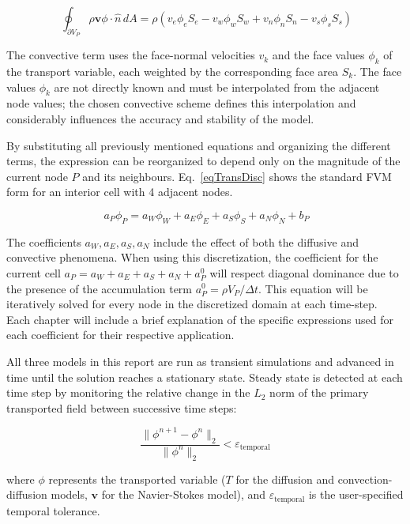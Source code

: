 \begin{equation}~\label{eqTransConv}
    \oint_{\partial V_P} \rho \mathbf{v} \phi \cdot \hat{n} \, dA = \rho (v_e \phi_e S_e - v_w \phi_w S_w + v_n \phi_n S_n - v_s \phi_s S_s)
\end{equation}

The convective term uses the face-normal velocities $v_k$ and the face values $\phi_k$ of the transport variable, each weighted by the corresponding face area $S_k$. The face values $\phi_k$ are not directly known and must be interpolated from the adjacent node values; the chosen convective scheme defines this interpolation and considerably influences the accuracy and stability of the model.

By substituting all previously mentioned equations and organizing the different terms, the expression can be reorganized to depend only on the magnitude of the current node $P$ and its neighbours. Eq.~\eqref{eqTransDisc} shows the standard FVM form for an interior cell with 4 adjacent nodes.

\begin{equation}~\label{eqTransDisc}
    a_P \phi_P = a_W \phi_W + a_E \phi_E + a_S \phi_S + a_N \phi_N + b_P
\end{equation}

The coefficients $a_W, a_E, a_S, a_N$ include the effect of both the diffusive and convective phenomena. When using this discretization, the coefficient for the current cell $a_P = a_W + a_E + a_S + a_N + a^0_P$ will respect diagonal dominance due to the presence of the accumulation term $a^0_P = \rho V_P / \Delta t$. This equation will be iteratively solved for every node in the discretized domain at each time-step. Each chapter will include a brief explanation of the specific expressions used for each coefficient for their respective application.

All three models in this report are run as transient simulations and advanced in time until the solution reaches a stationary state. Steady state is detected at each time step by monitoring the relative change in the $L_2$ norm of the primary transported field between successive time steps:

\begin{equation}\label{eqSteadyState}
    \frac{\|\phi^{n+1} - \phi^n\|_2}{\|\phi^n\|_2} < \varepsilon_\text{temporal}
\end{equation}

where $\phi$ represents the transported variable ($T$ for the diffusion and convection-diffusion models, $\mathbf{v}$ for the Navier-Stokes model), and $\varepsilon_\text{temporal}$ is the user-specified temporal tolerance. 


